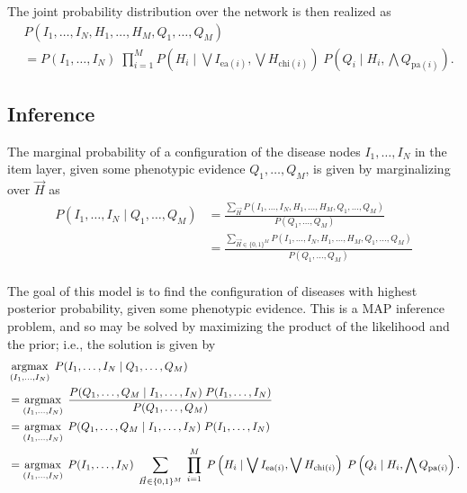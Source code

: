 The joint probability distribution over the network is then realized as
%
\begin{align}
    &P(I_1, \hdots, I_N, H_1, \hdots, H_M, Q_1, \hdots, Q_M) \nonumber\\
    &=  P(I_1, \hdots, I_N) 
    \; \prod_{i=1}^M P\left(H_i \mid \bigvee I_{\text{ea}(i)}, \bigvee H_{\text{chi}(i)}\right)
    \; P\left(Q_i \mid H_i, \bigwedge Q_{\text{pa}(i)}\right). \label{eq:joint}
\end{align}

\subsection{Inference}

The marginal probability of a configuration of the disease nodes $I_1, \hdots,
I_N$ in the item layer, given some phenotypic evidence $Q_1, \hdots, Q_M$, is
given by marginalizing over $\vec{H}$ as
%
\begin{align*}
    P(I_1, \hdots, I_N \mid Q_1, \hdots, Q_M)
    &= \frac{\sum_{\vec{H}} P(I_1, \hdots, I_N, H_1, \hdots, H_M, Q_1, \hdots, Q_M)}{P(Q_1, \hdots, Q_M)} \\
    &= \frac{\sum_{\vec{H} \in \{0, 1\}^M} P(I_1, \hdots, I_N, H_1, \hdots, H_M, Q_1, \hdots, Q_M)}{P(Q_1, \hdots, Q_M)} \\
\end{align*}

The goal of this model is to find the configuration of diseases with highest
posterior probability, given some phenotypic evidence.
%
This is a MAP inference problem, and so may be solved by maximizing the product
of the likelihood and the prior; i.e., the solution is given by
%
\begin{align}
    &\argmax_{(I_1, \hdots, I_N)} \;
    P(I_1, \hdots, I_N \mid Q_1, \hdots, Q_M) \nonumber\\
    &= \argmax_{(I_1, \hdots, I_N)} \;
    \frac{P(Q_1, \hdots, Q_M \mid I_1, \hdots, I_N )\; P(I_1, \hdots, I_N)}{P(Q_1, \hdots, Q_M)} \nonumber\\
    &= \argmax_{(I_1, \hdots, I_N)} \;
    P(Q_1, \hdots, Q_M \mid I_1, \hdots, I_N )\; P(I_1, \hdots, I_N) \nonumber\\
    &= \argmax_{(I_1, \hdots, I_N)} \;
    P(I_1, \hdots, I_N)
    \;\sum_{\vec{H} \in \{0, 1\}^M} \; \prod_{i=1}^M \; P\left(H_i \mid \bigvee I_{\text{ea}(i)}, \bigvee H_{\text{chi}(i)}\right)
    \; P\left(Q_i \mid H_i, \bigwedge Q_{\text{pa}(i)}\right).\label{eq:mapinf}
\end{align}

